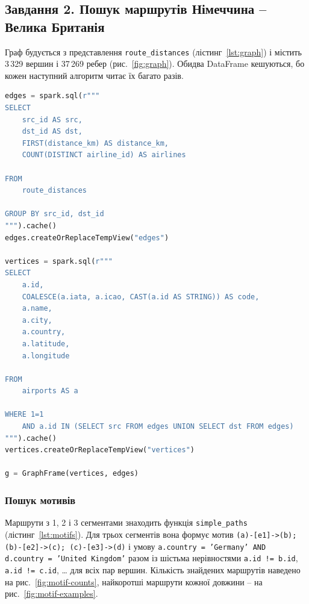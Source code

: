 \documentclass{iasa-lab}
\begin{document}


\subsection{Завдання 2. Пошук маршрутів Німеччина -- Велика Британія}

Граф будується з представлення \texttt{route\_distances} (лістинг~\ref{lst:graph}) і містить 3\,329 вершин і 37\,269 ребер (рис.~\ref{fig:graph}). Обидва DataFrame кешуються, бо кожен наступний алгоритм читає їх багато разів.

\begin{lstlisting}[language=Python, caption={Побудова графа авіасполучень}, label={lst:graph}]
edges = spark.sql(r"""
SELECT
    src_id AS src,
    dst_id AS dst,
    FIRST(distance_km) AS distance_km,
    COUNT(DISTINCT airline_id) AS airlines

FROM
    route_distances

GROUP BY src_id, dst_id
""").cache()
edges.createOrReplaceTempView("edges")

vertices = spark.sql(r"""
SELECT
    a.id,
    COALESCE(a.iata, a.icao, CAST(a.id AS STRING)) AS code,
    a.name,
    a.city,
    a.country,
    a.latitude,
    a.longitude

FROM
    airports AS a

WHERE 1=1
    AND a.id IN (SELECT src FROM edges UNION SELECT dst FROM edges)
""").cache()
vertices.createOrReplaceTempView("vertices")

g = GraphFrame(vertices, edges)
\end{lstlisting}


\subsubsection{Пошук мотивів}

Маршрути з 1, 2 і 3 сегментами знаходить функція \texttt{simple\_paths} (лістинг~\ref{lst:motifs}). Для трьох сегментів вона формує мотив \texttt{(a)-[e1]->(b); (b)-[e2]->(c); (c)-[e3]->(d)} і умову \texttt{a.country = 'Germany' AND d.country = 'United Kingdom'} разом із шістьма нерівностями \texttt{a.id != b.id}, \texttt{a.id != c.id}, \ldots{} для всіх пар вершин. Кількість знайдених маршрутів наведено на рис.~\ref{fig:motif-counts}, найкоротші маршрути кожної довжини -- на рис.~\ref{fig:motif-examples}.
\end{document}
